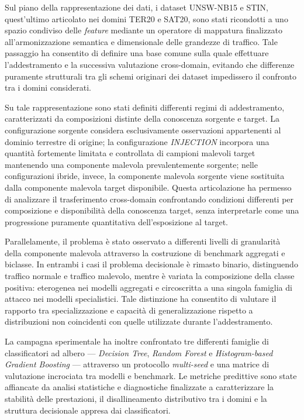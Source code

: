 Sul piano della rappresentazione dei dati, i dataset UNSW-NB15 e STIN, quest'ultimo articolato nei domini TER20 e SAT20, sono stati ricondotti a uno spazio condiviso delle \textit{feature} mediante un operatore di mappatura finalizzato all'armonizzazione semantica e dimensionale delle grandezze di traffico. 
Tale passaggio ha consentito di definire una base comune sulla quale effettuare l'addestramento e la successiva valutazione cross-domain, evitando che differenze puramente strutturali tra gli schemi originari dei dataset impedissero il confronto tra i domini considerati.

Su tale rappresentazione sono stati definiti differenti regimi di addestramento, caratterizzati da composizioni distinte della conoscenza sorgente e target. 
La configurazione sorgente considera esclusivamente osservazioni appartenenti al dominio terrestre di origine; la configurazione \textit{INJECTION} incorpora una quantità fortemente limitata e controllata di campioni malevoli target mantenendo una componente malevola prevalentemente sorgente; nelle configurazioni ibride, invece, la componente malevola sorgente viene sostituita dalla componente malevola target disponibile. 
Questa articolazione ha permesso di analizzare il trasferimento cross-domain confrontando condizioni differenti per composizione e disponibilità della conoscenza target, senza interpretarle come una progressione puramente quantitativa dell'esposizione al target.

Parallelamente, il problema è stato osservato a differenti livelli di granularità della componente malevola attraverso la costruzione di benchmark aggregati e biclasse. 
In entrambi i casi il problema decisionale è rimasto binario, distinguendo traffico normale e traffico malevolo, mentre è variata la composizione della classe positiva: eterogenea nei modelli aggregati e circoscritta a una singola famiglia di attacco nei modelli specialistici. 
Tale distinzione ha consentito di valutare il rapporto tra specializzazione e capacità di generalizzazione rispetto a distribuzioni non coincidenti con quelle utilizzate durante l'addestramento.

La campagna sperimentale ha inoltre confrontato tre differenti famiglie di classificatori ad albero --- \textit{Decision Tree}, \textit{Random Forest} e \textit{Histogram-based Gradient Boosting} --- attraverso un protocollo \textit{multi-seed} e una matrice di valutazione incrociata tra modelli e benchmark. 
Le metriche predittive sono state affiancate da analisi statistiche e diagnostiche finalizzate a caratterizzare la stabilità delle prestazioni, il disallineamento distributivo tra i domini e la struttura decisionale appresa dai classificatori.


